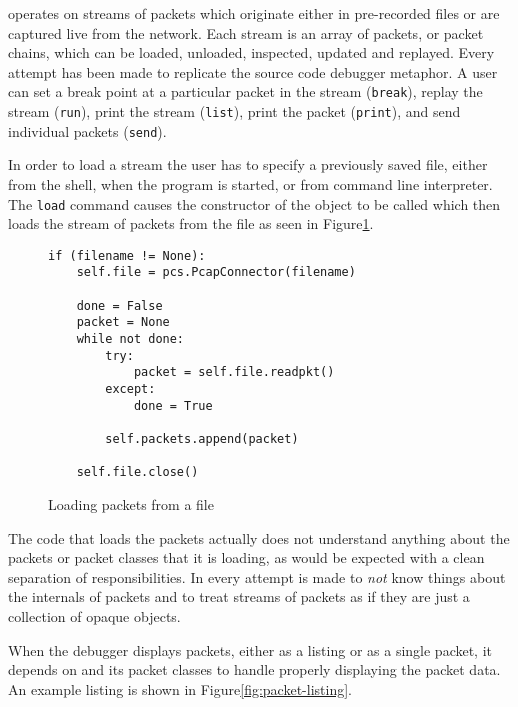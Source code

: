 \documentclass{sig-alternate-10pt}
\begin{document}
 operates on streams of packets which originate either in
pre-recorded  files or are captured live from the
network.  Each stream is an array of packets, or packet chains, which
can be loaded, unloaded, inspected, updated and replayed.  Every
attempt has been made to replicate the source code debugger metaphor.
A user can set a break point at a particular packet in the stream
(\verb|break|), replay the stream (\verb|run|), print the stream
(\verb|list|), print the packet (\verb|print|), and send individual
packets (\verb|send|).

In order to load a stream the user has to specify a previously saved
 file, either from the shell, when the program is
started, or from  command line interpreter.  The
\verb|load| command causes the constructor of the 
object to be called which then loads the stream of packets from the
file as seen in Figure\ref{fig:loading-packets-from-a-file}.

\begin{figure}
  \centering
\begin{verbatim}
if (filename != None):
    self.file = pcs.PcapConnector(filename)

    done = False
    packet = None
    while not done:
        try:
            packet = self.file.readpkt()
        except:
            done = True

        self.packets.append(packet)

    self.file.close()
\end{verbatim}
  \caption{Loading packets from a file}
  \label{fig:loading-packets-from-a-file}
\end{figure}

The code that loads the packets actually does not understand anything
about the packets or packet classes that it is loading, as would be
expected with a clean separation of responsibilities.  In 
every attempt is made to \emph{not} know things about the internals of
packets and to treat streams of packets as if they are just a
collection of opaque objects.

When the debugger displays packets, either as a listing or as a single
packet, it depends on  and its packet classes to handle
properly displaying the packet data.  An example listing is shown in
Figure\ref{fig:packet-listing}.
\end{document}
